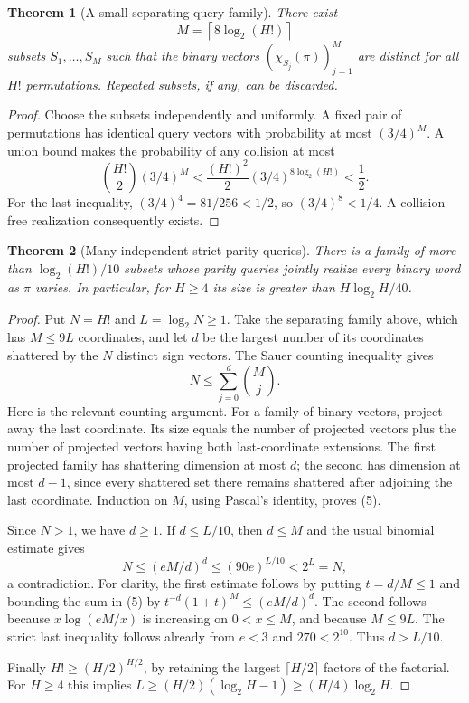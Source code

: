 \documentclass[11pt]{article}
\newtheorem{theorem}{Theorem}
\begin{document}
\begin{theorem}[A small separating query family]
There exist
\[
 M=\left\lceil8\log_2(H!)\right\rceil
 \tag{4}
\]
subsets $S_1,\ldots,S_M$ such that the binary vectors
$(\chi_{S_j}(\pi))_{j=1}^M$ are distinct for all $H!$ permutations.
Repeated subsets, if any, can be discarded.
\end{theorem}
\begin{proof}
Choose the subsets independently and uniformly. A fixed pair of
permutations has identical query vectors with probability at most
$(3/4)^M$. A union bound makes the probability of any collision at
most
\[
 {H!\choose2}(3/4)^M<\frac{(H!)^2}{2}
                  (3/4)^{8\log_2(H!)}<\frac12.
\]
For the last inequality, $(3/4)^4=81/256<1/2$, so
$(3/4)^8<1/4$. A collision-free realization consequently exists.
\end{proof}

\begin{theorem}[Many independent strict parity queries]
There is a family of more than $\log_2(H!)/10$ subsets whose parity
queries jointly realize every binary word as $\pi$ varies. In
particular, for $H\geq4$ its size is greater than
$H\log_2 H/40$.
\end{theorem}
\begin{proof}
Put $N=H!$ and $L=\log_2N\geq1$. Take the separating family above,
which has $M\leq9L$ coordinates, and let $d$ be the largest number
of its coordinates shattered by the $N$ distinct sign vectors.
The Sauer counting inequality gives
\[
 N\leq\sum_{j=0}^d{M\choose j}.
 \tag{5}
\]
Here is the relevant counting argument. For a family of binary
vectors, project away the last coordinate. Its size equals the
number of projected vectors plus the number of projected vectors
having both last-coordinate extensions. The first projected family
has shattering dimension at most $d$; the second has dimension at
most $d-1$, since every shattered set there remains shattered after
adjoining the last coordinate. Induction on $M$, using Pascal's
identity, proves (5).

Since $N>1$, we have $d\geq1$. If $d\leq L/10$, then $d\leq M$
and the usual binomial estimate gives
\[
 N\leq(eM/d)^d\leq(90e)^{L/10}<2^L=N,
 \tag{6}
\]
a contradiction. For clarity, the first estimate follows by putting
$t=d/M\leq1$ and bounding the sum in (5) by
$t^{-d}(1+t)^M\leq(eM/d)^d$. The second follows because
$x\log(eM/x)$ is increasing on $0<x\leq M$, and because $M\leq9L$.
The strict last inequality follows already from $e<3$ and
$270<2^{10}$. Thus $d>L/10$.

Finally $H!\geq(H/2)^{H/2}$, by retaining the largest
$\lceil H/2\rceil$ factors of the factorial. For $H\geq4$ this
implies
$L\geq(H/2)(\log_2H-1)\geq(H/4)\log_2H$.
\end{proof}
\end{document}
